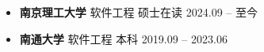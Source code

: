 \documentclass[zh]{resume}
\begin{document}
\makeheader

\begin{abstract}
南京理工大学软件工程硕士在读，具备软件开发与自动化工程基础，求职 DFT 工程师方向。了解数字电路、RTL 与可测试性设计基础，以及 SCAN、ATPG、MBIST 基本原理；熟悉 Linux 环境使用、Python 脚本与 Git，具备批处理、日志排查和问题定位能力。曾参与中电科 28 所模型管理平台及 JF-AIX 企业级平台研发，独立实现教辅录题与审核平台，具备任务调度与系统监控经验。
\end{abstract}

\begin{itemize}
  \item \textbf{南京理工大学} \textbullet{} 软件工程 \textbullet{} 硕士在读 \hfill 2024.09 -- 至今
  \item \textbf{南通大学} \textbullet{} 软件工程 \textbullet{} 本科 \hfill 2019.09 -- 2023.06
\end{itemize}
\end{document}
